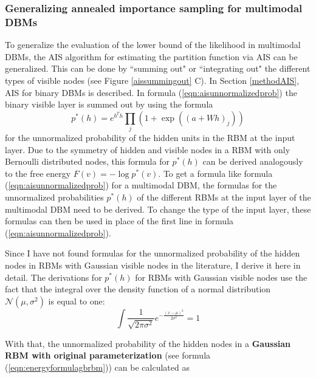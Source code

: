 \documentclass[12pt]{article}
\begin{document}
\subsubsection{Generalizing annealed importance sampling for multimodal DBMs} \label{unnormalizedprobsrbm}

To generalize the evaluation of the lower bound of the likelihood in multimodal DBMs, the AIS algorithm for estimating the partition function via AIS can be generalized.
This can be done by ``summing out" or ``integrating out" the different types of visible nodes (see Figure \ref{aissummingout} C).
In Section \ref{methodAIS}, AIS for binary DBMs is described.
In formula (\ref{eqn:aisunnormalizedprob}) the binary visible layer is summed out by using the formula
\[
p^*(h) = e^{b^T h} \prod_j (1+ \exp((a + W h)_j))
\]
for the unnormalized probability of the hidden units in the RBM at the input layer.
Due to the symmetry of hidden and visible nodes in a RBM with only Bernoulli distributed nodes, this formula for $p^*(h)$ can be derived analogously to the free energy $F(v) = - \log p^*(v)$.
To get a formula like formula (\ref{eqn:aisunnormalizedprob}) for a multimodal DBM, the formulas for the unnormalized probabilities $p^*(h)$ of the different RBMs at the input layer of the multimodal DBM need to be derived.
To change the type of the input layer, these formulas can then be used in place of the first line in formula (\ref{eqn:aisunnormalizedprob}).


Since I have not found formulas for the unnormalized probability of the hidden nodes in RBMs with Gaussian visible nodes in the literature, I derive it here in detail.
The derivations for $p^*(h)$ for RBMs with Gaussian visible nodes use the fact that the integral over the density function of a normal distribution $\mathcal{N}(\mu, \sigma^2)$ is equal to one:
\begin{equation} \int \frac{1}{\sqrt{2 \pi \sigma^2}} e^{ -\frac{(x - \mu)^2}{2 \sigma^2}} = 1
\label{eqn:densitynormal}
\end{equation}

With that, the unnormalized probability of the hidden nodes in a {\bf Gaussian RBM with original parameterization} (see formula (\ref{eqn:energyformulagbrbm})) can be calculated as
\end{document}
